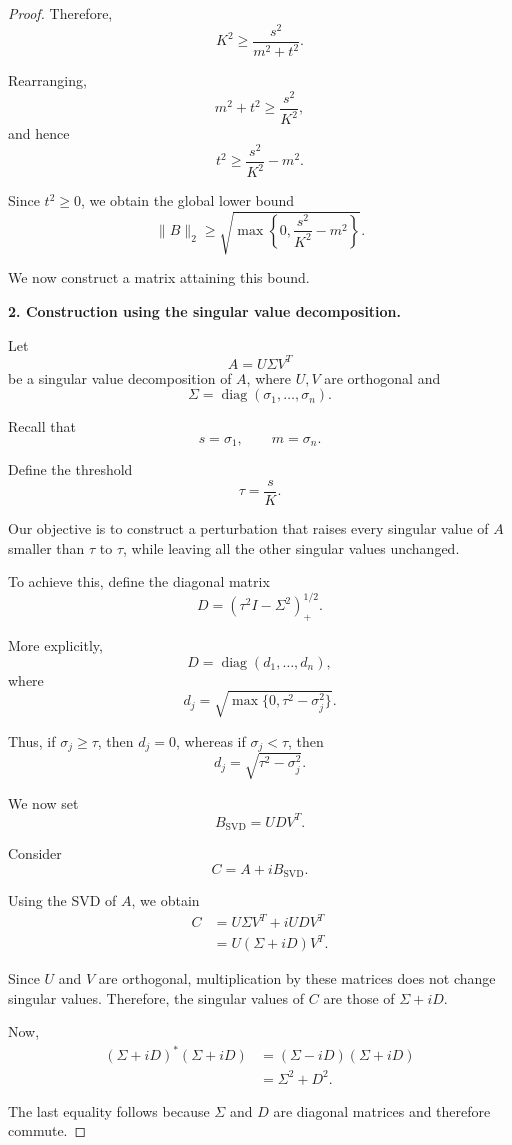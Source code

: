 \documentclass[11pt, reqno, a4paper]{amsart}
\theoremstyle{plain}
\theoremstyle{definition}
\theoremstyle{remark}
\numberwithin{equation}{section}
\begin{document}
\begin{proof}
Therefore,
\[
K^2\geq\frac{s^2}{m^2+t^2}.
\]

Rearranging,
\[
m^2+t^2\geq\frac{s^2}{K^2},
\]
and hence
\[
t^2\geq\frac{s^2}{K^2}-m^2.
\]

Since $t^2\geq0$, we obtain the global lower bound
\[
\boxed{
\|B\|_2
\geq
\sqrt{
\max\left\{
0,\frac{s^2}{K^2}-m^2
\right\}
}.
}
\]

We now construct a matrix attaining this bound.

\medskip

\noindent
\textbf{2. Construction using the singular value decomposition.}

Let
\[
A=U\Sigma V^T
\]
be a singular value decomposition of $A$, where
$U,V$ are orthogonal and
\[
\Sigma=\operatorname{diag}(\sigma_1,\ldots,\sigma_n).
\]

Recall that
\[
s=\sigma_1,
\qquad
m=\sigma_n.
\]

Define the threshold
\[
\tau=\frac{s}{K}.
\]

Our objective is to construct a perturbation that raises
every singular value of $A$ smaller than $\tau$ to $\tau$,
while leaving all the other singular values unchanged.

To achieve this, define the diagonal matrix
\[
D=
\left(
\tau^2I-\Sigma^2
\right)_+^{1/2}.
\]

More explicitly,
\[
D=\operatorname{diag}(d_1,\ldots,d_n),
\]
where
\[
d_j=
\sqrt{
\max\{0,\tau^2-\sigma_j^2\}
}.
\]

Thus, if $\sigma_j\geq\tau$, then $d_j=0$, whereas if
$\sigma_j<\tau$, then
\[
d_j=\sqrt{\tau^2-\sigma_j^2}.
\]

We now set
\[
\boxed{
B_{\mathrm{SVD}}=UDV^T.
}
\]

Consider
\[
C=A+iB_{\mathrm{SVD}}.
\]

Using the SVD of $A$, we obtain
\begin{align*}
C
&=U\Sigma V^T+iUDV^T\\
&=U(\Sigma+iD)V^T.
\end{align*}

Since $U$ and $V$ are orthogonal, multiplication by these
matrices does not change singular values. Therefore, the
singular values of $C$ are those of $\Sigma+iD$.

Now,
\begin{align*}
(\Sigma+iD)^*(\Sigma+iD)
&=(\Sigma-iD)(\Sigma+iD)\\
&=\Sigma^2+D^2.
\end{align*}

The last equality follows because $\Sigma$ and $D$ are
diagonal matrices and therefore commute.


\end{proof}
\end{document}
